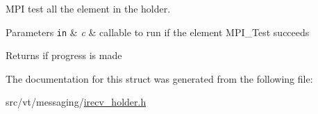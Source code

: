 M\+PI test all the element in the holder. 


\begin{DoxyParams}[1]{Parameters}
\mbox{\tt in}  & {\em c} & callable to run if the element {\ttfamily M\+P\+I\+\_\+\+Test} succeeds\\
\hline
\end{DoxyParams}
\begin{DoxyReturn}{Returns}
if progress is made 
\end{DoxyReturn}


The documentation for this struct was generated from the following file\+:\begin{DoxyCompactItemize}
\item 
src/vt/messaging/\hyperlink{irecv__holder_8h}{irecv\+\_\+holder.\+h}\end{DoxyCompactItemize}
